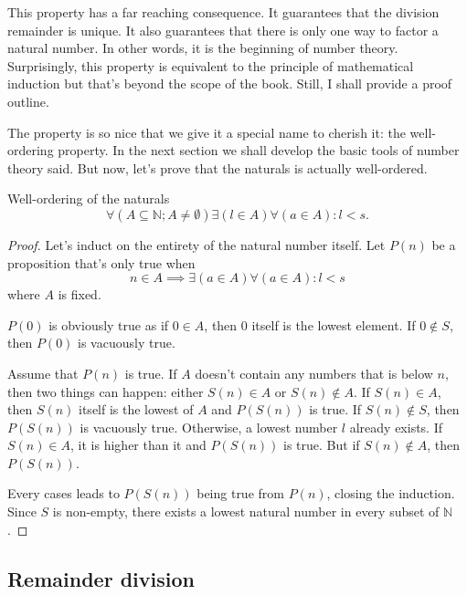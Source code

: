 This property has a far reaching consequence. It guarantees that the division remainder is unique.
It also guarantees that there is only one way to factor a natural number. In other words, it is the
beginning of number theory. Surprisingly, this property is equivalent to the principle of
mathematical induction but that's beyond the scope of the book. Still, I shall provide a proof
outline.

The property is so nice that we give it a special name to cherish it: the well-ordering property. In
the next section we shall develop the basic tools of number theory said. But now, let's prove that
the naturals is actually well-ordered.

\begin{lemma}{Well-ordering of the naturals}{}
  \begin{equation}
    \forall (A \subseteq \mathbb{N} ; A \neq \emptyset) \exists (l \in A) \forall (a \in A) : l < s.
  \end{equation}
\end{lemma}

\begin{proof}
  Let's induct on the entirety of the natural number itself. Let \(P(n)\) be a proposition that's
  only true when
  \begin{equation}
    n \in A \implies \exists (a \in A) \forall (a \in A) : l < s
  \end{equation}
  where \(A\) is fixed.

  \basecase \(P(0)\) is obviously true as if \(0 \in A\), then \(0\) itself is the lowest element.
  If \(0 \notin S\), then \(P(0)\) is vacuously true.

  \inductivestep Assume that \(P(n)\) is true. If \(A\) doesn't contain any numbers that is below
  \(n\), then two things can happen: either \(S(n) \in A\) or \(S(n) \notin A\). If \(S(n) \in A\),
  then \(S(n)\) itself is the lowest of \(A\) and \(P(S(n))\) is true. If \(S(n) \notin S\), then
  \(P(S(n))\) is vacuously true. Otherwise, a lowest number \(l\) already exists. If \(S(n) \in A\),
  it is higher than it and \(P(S(n))\) is true. But if \(S(n) \notin A\), then \(P(S(n))\).

  Every cases leads to \(P(S(n))\) being true from \(P(n)\), closing the induction. Since \(S\) is
  non-empty, there exists a lowest natural number in every subset of \(\mathbb{N}\).
\end{proof}

\subsection{Remainder division}

